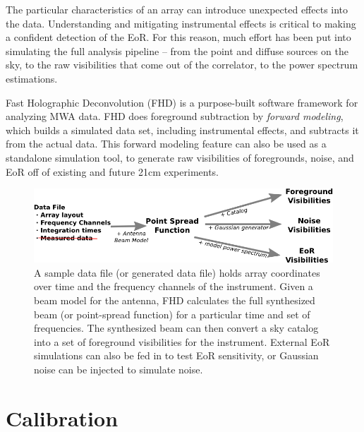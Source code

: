 \documentclass[a0,landscape]{a0poster}
\begin{document}
\begin{multicols}{4}
The particular characteristics of an array can introduce unexpected effects into the data. Understanding and mitigating instrumental effects is critical to making a confident detection of the EoR. For this reason, much effort has been put into simulating the full analysis pipeline -- from the point and diffuse sources on the sky, to the raw visibilities that come out of the correlator, to the power spectrum estimations.

Fast Holographic Deconvolution (FHD) is a purpose-built software framework for analyzing MWA data. FHD does foreground subtraction by \emph{forward modeling}, which builds a simulated data set, including instrumental effects, and subtracts it from the actual data. This forward modeling feature can also be used as a standalone simulation tool, to generate raw visibilities of foregrounds, noise, and EoR off of existing and future 21cm experiments.

\begin{figure}[H]
\centering
\includegraphics[scale=1]{figures/sim_flowchart.png}
\caption{A sample data file (or generated data file) holds array coordinates over time and the frequency channels of the instrument. Given a beam model for the antenna, FHD calculates the full synthesized beam (or point-spread function) for a particular time and set of frequencies. The synthesized beam can then convert a sky catalog into a set of foreground visibilities for the instrument. External EoR simulations can also be fed in to test EoR sensitivity, or Gaussian noise can be injected to simulate noise.}
\end{figure}


\section*{Calibration}



\end{multicols}
\end{document}
